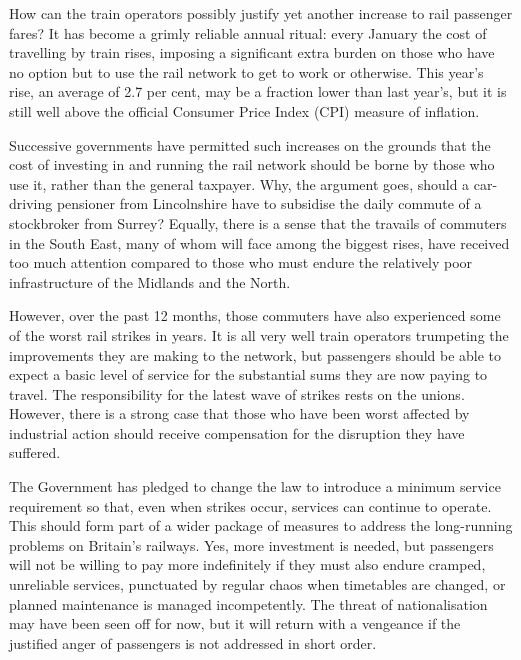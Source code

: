 How can the train operators possibly justify yet another increase to rail passenger fares? It has become a grimly reliable annual ritual: every January the cost of travelling by train rises, imposing a significant extra burden on those who have no option but to use the rail network to get to work or otherwise. This year's rise, an average of 2.7 per cent, may be a fraction lower than last year's, but it is still well above the official Consumer Price Index (CPI) measure of inflation.


Successive governments have permitted such increases on the grounds that the cost of investing in and running the rail network should be borne by those who use it, rather than the general taxpayer. Why, the argument goes, should a car-driving pensioner from Lincolnshire have to subsidise the daily commute of a stockbroker from Surrey? Equally, there is a sense that the travails of commuters in the South East, many of whom will face among the biggest rises, have received too much attention compared to those who must endure the relatively poor infrastructure of the Midlands and the North.


However, over the past 12 months, those commuters have also experienced some of the worst rail strikes in years. It is all very well train operators trumpeting the improvements they are making to the network, but passengers should be able to expect a basic level of service for the substantial sums they are now paying to travel. The responsibility for the latest wave of strikes rests on the unions. However, there is a strong case that those who have been worst affected by industrial action should receive compensation for the disruption they have suffered.


The Government has pledged to change the law to introduce a minimum service requirement so that, even when strikes occur, services can continue to operate. This should form part of a wider package of measures to address the long-running problems on Britain's railways. Yes, more investment is needed, but passengers will not be willing to pay more indefinitely if they must also endure cramped, unreliable services, punctuated by regular chaos when timetables are changed, or planned maintenance is managed incompetently. The threat of nationalisation may have been seen off for now, but it will return with a vengeance if the justified anger of passengers is not addressed in short order.